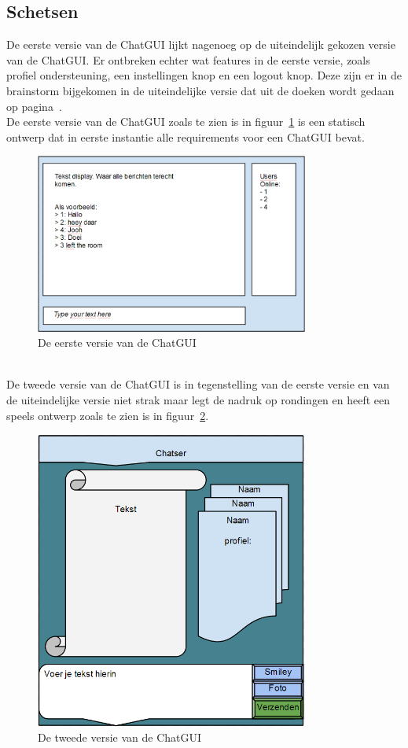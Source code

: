 \documentclass[12pt]{article}
\begin{document}
\subsection{Schetsen}
De eerste versie van de ChatGUI lijkt nagenoeg op de uiteindelijk gekozen versie van de ChatGUI. Er ontbreken echter wat features in de eerste versie, zoals profiel ondersteuning, een instellingen knop en een  logout knop. Deze zijn er in de brainstorm bijgekomen in de uiteindelijke versie dat uit de doeken wordt gedaan op pagina~\pageref{Chat Window}. \\
De eerste versie van de ChatGUI zoals te zien is in figuur~\ref{figure001} is een statisch ontwerp dat in eerste instantie alle requirements voor een ChatGUI bevat.
\begin{figure}[ht]
\begin{center}
\includegraphics[width =90mm]{ChGDv1}
\caption{De eerste versie van de ChatGUI}
\label{figure001}
\end{center}
\end{figure}
\\

\noindent De tweede versie van de ChatGUI is in tegenstelling van de eerste versie en van de uiteindelijke versie niet strak maar legt de nadruk op rondingen en heeft een speels ontwerp zoals te zien is in figuur~\ref{figure002}.
\begin{figure}[ht]
\begin{center}
\includegraphics[width = 90mm]{ChGDv2}
\caption{De tweede versie van de ChatGUI}
\label{figure002}
\end{center}
\end{figure}
\\
\end{document}
